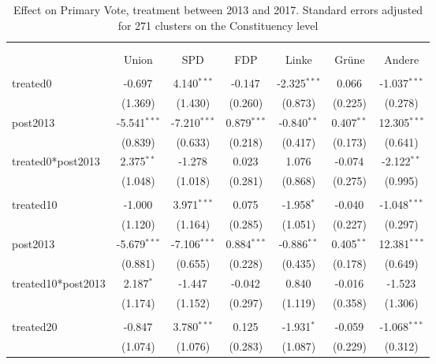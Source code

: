 \documentclass[12pt]{article}
\begin{document}
 
\begin{table}[!htbp] \centering
  \caption{Effect on Primary Vote, treatment between 2013 and 2017. Standard errors adjusted for 271 clusters on the Constituency level}
\begin{tabular}{@{\extracolsep{5pt}}lcccccc}
\\[-1.8ex]\hline
\hline \\[-1.8ex]
\\[-1.8ex] & \multicolumn{1}{c}{Union} & \multicolumn{1}{c}{SPD} & \multicolumn{1}{c}{FDP} & \multicolumn{1}{c}{Linke} & \multicolumn{1}{c}{Grüne} & \multicolumn{1}{c}{Andere}  \\
\hline \\[-1.8ex]
 treated0 & -0.697$^{}$ & 4.140$^{***}$ & -0.147$^{}$ & -2.325$^{***}$ & 0.066$^{}$ & -1.037$^{***}$ \\
  & (1.369) & (1.430) & (0.260) & (0.873) & (0.225) & (0.278) \\
 post2013 & -5.541$^{***}$ & -7.210$^{***}$ & 0.879$^{***}$ & -0.840$^{**}$ & 0.407$^{**}$ & 12.305$^{***}$ \\
  & (0.839) & (0.633) & (0.218) & (0.417) & (0.173) & (0.641) \\
 treated0*post2013 & 2.375$^{**}$ & -1.278$^{}$ & 0.023$^{}$ & 1.076$^{}$ & -0.074$^{}$ & -2.122$^{**}$ \\
  & (1.048) & (1.018) & (0.281) & (0.868) & (0.275) & (0.995) \\
\hline \\[-1.8ex]
 treated10 & -1.000$^{}$ & 3.971$^{***}$ & 0.075$^{}$ & -1.958$^{*}$ & -0.040$^{}$ & -1.048$^{***}$ \\
  & (1.120) & (1.164) & (0.285) & (1.051) & (0.227) & (0.297) \\
 post2013 & -5.679$^{***}$ & -7.106$^{***}$ & 0.884$^{***}$ & -0.886$^{**}$ & 0.405$^{**}$ & 12.381$^{***}$ \\
  & (0.881) & (0.655) & (0.228) & (0.435) & (0.178) & (0.649) \\
 treated10*post2013 & 2.187$^{*}$ & -1.447$^{}$ & -0.042$^{}$ & 0.840$^{}$ & -0.016$^{}$ & -1.523$^{}$ \\
  & (1.174) & (1.152) & (0.297) & (1.119) & (0.358) & (1.306) \\
\hline \\[-1.8ex]
 treated20 & -0.847$^{}$ & 3.780$^{***}$ & 0.125$^{}$ & -1.931$^{*}$ & -0.059$^{}$ & -1.068$^{***}$ \\
  & (1.074) & (1.076) & (0.283) & (1.087) & (0.229) & (0.312) \\

\end{tabular}
\end{table}
\end{document}
